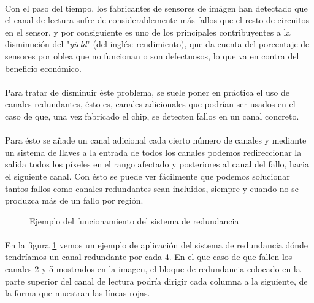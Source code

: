 \paragraph{}
Con el paso del tiempo, los fabricantes de sensores de imágen han detectado que
el canal de lectura sufre de considerablemente más fallos que el resto de circuitos
en el sensor, y por consiguiente es uno de los principales contribuyentes a la
disminución del "\textit{yield}" (del inglés: rendimiento), que da cuenta del
porcentaje de sensores por oblea que no funcionan o son defectuosos, lo que va
en contra del beneficio económico.

\paragraph{}
Para tratar de disminuir éste problema, se suele poner en práctica el uso de canales
redundantes, ésto es, canales adicionales que podrían ser usados en el caso de que,
una vez fabricado el chip, se detecten fallos en un canal concreto.

\paragraph{}
Para ésto se añade un canal adicional cada cierto número de canales y mediante un
sistema de llaves a la entrada de todos los canales podemos redireccionar la
salida todos los píxeles en el rango afectado y posteriores al canal del fallo,
hacia el siguiente canal. Con ésto se puede ver fácilmente que podemos solucionar
tantos fallos como canales redundantes sean incluidos, siempre y cuando no se
produzca más de un fallo por región.

\begin{figure}[h]
	
	\caption{Ejemplo del funcionamiento del sistema de redundancia}
	\label{fig:redundancy}
\end{figure}

\paragraph{}
En la figura \ref{fig:redundancy} vemos un ejemplo de aplicación del sistema de
redundancia dónde tendríamos un canal redundante por cada 4. En el que caso de que
fallen los canales 2 y 5 mostrados en la imagen, el bloque de redundancia colocado
en la parte superior del canal de lectura podría dirigir cada columna a la siguiente,
de la forma que muestran las líneas rojas.

